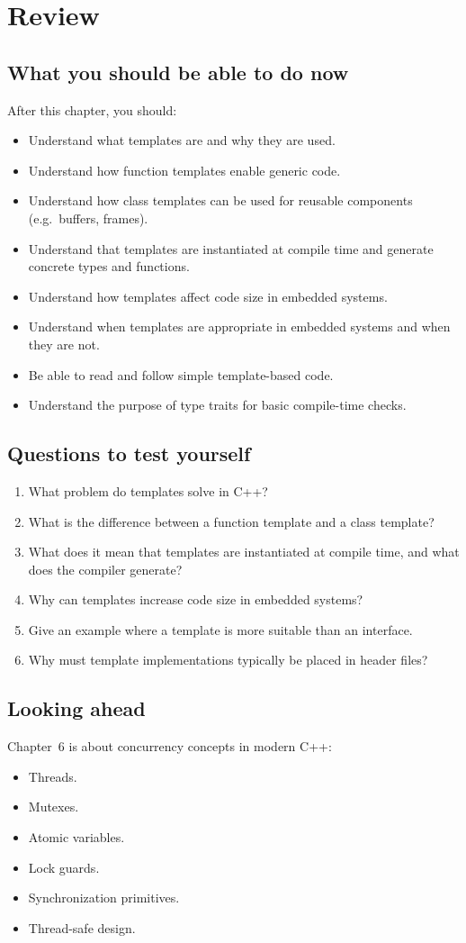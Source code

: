 
\section{Review}
\label{c5:sec:review}

\subsection*{What you should be able to do now}
After this chapter, you should:
\begin{itemize}
  \item Understand what templates are and why they are used.
  \item Understand how function templates enable generic code.
  \item Understand how class templates can be used for reusable components (e.g.\ buffers,
    frames).
  \item Understand that templates are instantiated at compile time and generate concrete
    types and functions.
  \item Understand how templates affect code size in embedded systems.
  \item Understand when templates are appropriate in embedded systems and when they are not.
  \item Be able to read and follow simple template-based code.
  \item Understand the purpose of type traits for basic compile-time checks.
\end{itemize}

\subsection*{Questions to test yourself}
\begin{enumerate}
  \item What problem do templates solve in C++?
  \item What is the difference between a function template and a class template?
  \item What does it mean that templates are instantiated at compile time, and what does the
    compiler generate?
  \item Why can templates increase code size in embedded systems?
  \item Give an example where a template is more suitable than an interface.
  \item Why must template implementations typically be placed in header files?
\end{enumerate}

\subsection*{Looking ahead}
Chapter~6 is about concurrency concepts in modern C++:
\begin{itemize}
  \item Threads.
  \item Mutexes.
  \item Atomic variables.
  \item Lock guards.
  \item Synchronization primitives.
  \item Thread-safe design.
\end{itemize}
